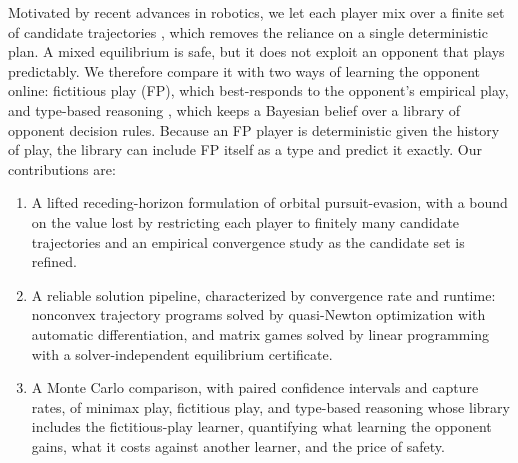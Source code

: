 \documentclass[letterpaper, 10 pt, conference]{ieeeconf}  %
\begin{document}
Motivated by recent advances in robotics, we let each player mix over a finite set of candidate trajectories \cite{peters2022learning, hanlongResearchStrategiesMultiSpacecraft2024}, which removes the reliance on a single deterministic plan. A mixed equilibrium is safe, but it does not exploit an opponent that plays predictably. We therefore compare it with two ways of learning the opponent online: fictitious play (FP), which best-responds to the opponent's empirical play, and type-based reasoning \cite{albrecht2016belief}, which keeps a Bayesian belief over a library of opponent decision rules. Because an FP player is deterministic given the history of play, the library can include FP itself as a type and predict it exactly. Our contributions are:

\begin{enumerate}
    \item A lifted receding-horizon formulation of orbital pursuit-evasion, with a bound on the value lost by restricting each player to finitely many candidate trajectories and an empirical convergence study as the candidate set is refined.
    \item A reliable solution pipeline, characterized by convergence rate and runtime: nonconvex trajectory programs solved by quasi-Newton optimization with automatic differentiation, and matrix games solved by linear programming with a solver-independent equilibrium certificate.
    \item A Monte Carlo comparison, with paired confidence intervals and capture rates, of minimax play, fictitious play, and type-based reasoning whose library includes the fictitious-play learner, quantifying what learning the opponent gains, what it costs against another learner, and the price of safety.
\end{enumerate}

% 
% 

\end{document}

